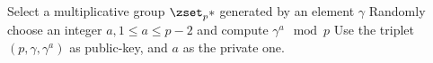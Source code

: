 \documentclass{subfiles}
\begin{document}
    \begin{procedure}
        \caption{ElGamal-Keygen()}\label{proc:ElGamal-keygen}
            \nl Select a multiplicative group $ \zset_{p}^{}*$ generated by an element $\gamma$
                \DontPrintSemicolon\;
            \nl Randomly choose an integer $a,  1 \le a \le p - 2$ and compute $\gamma^{a} \mod p$
                \DontPrintSemicolon\; 
            \nl Use the triplet $(p, \gamma, \gamma^{a})$ as public-key, and $a$ as the private one.
    \end{procedure}
\end{document}
